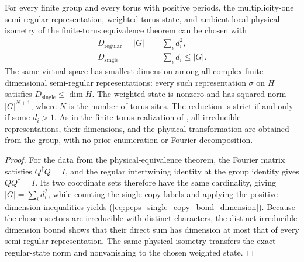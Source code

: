 \begin{lemma}%
    \label{thm:peps_torus_multiplicity_one_bond_dimensions}
    \leanok
    For every finite group and every torus with positive periods, the
    multiplicity-one semi-regular representation, weighted torus
    state, and ambient local physical isometry of the finite-torus
    equivalence theorem can be chosen with
    \begin{align}
        D_{\mathrm{regular}}=|G| & =\sum_i d_i^2,      \\
        D_{\mathrm{single}}      & =\sum_i d_i\le |G|.
    \end{align}
    The same virtual space has smallest dimension among all complex
    finite-dimensional semi-regular representations: every such representation
    $\sigma$ on $H$ satisfies $D_{\mathrm{single}}\le\dim H$.
    The weighted state is nonzero and has squared norm $|G|^{N+1}$,
    where $N$ is the number of torus sites.
    The reduction is strict if and only if some $d_i>1$. As in the
    finite-torus realization of \cite[Section~7]{Schuch2010PEPS}, all
    irreducible representations, their dimensions, and the physical
    transformation are obtained from the group, with no prior enumeration
    or Fourier decomposition.
\end{lemma}
\begin{proof}\leanok
    For the data from the physical-equivalence theorem, the Fourier matrix
    satisfies $Q^\dagger Q=I$, and the regular intertwining identity
    at the group identity gives $QQ^\dagger=I$. Its two coordinate
    sets therefore have the same cardinality, giving $|G|=\sum_i d_i^2$,
    while counting the single-copy labels and applying the positive dimension
    inequalities yields (\ref{eq:peps_single_copy_bond_dimension}).
    Because the chosen sectors are irreducible with distinct characters,
    the distinct irreducible dimension bound shows that their direct sum has
    dimension at most that of every semi-regular representation.
    The same physical isometry transfers the exact regular-state norm and
    nonvanishing to the chosen weighted state.
\end{proof}
